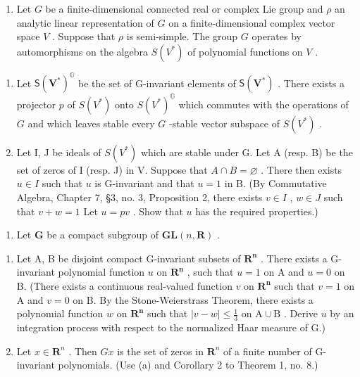\begin{enumerate}
\def\labelenumi{\arabic{enumi}.}
\setcounter{enumi}{33}
\tightlist
\item
  Let \(G\) be a finite-dimensional connected real or complex Lie group and \(\rho\) an analytic linear representation of \(G\) on a finite-dimensional complex vector space \(V\) . Suppose that \(\rho\) is semi-simple. The group \(G\) operates by automorphisms on the algebra \(S(V^*)\) of polynomial functions on \(V\) .
\end{enumerate}

\begin{enumerate}
\def\labelenumi{(\alph{enumi})}
\item
  Let \(\mathsf{S}(\mathbf{V}^{*})^{\mathbb{G}}\) be the set of G-invariant elements of \(\mathsf{S}(\mathbf{V}^{*})\) . There exists a projector \(p\) of \(S(V^{*})\) onto \(S(V^{*})^{\mathbb{G}}\) which commutes with the operations of \(G\) and which leaves stable every \(G\) -stable vector subspace of \(S(V^{*})\) .
\item
  Let I, J be ideals of \(S(V^*)\) which are stable under G. Let A (resp. B) be the set of zeros of I (resp. J) in V. Suppose that \(A \cap B = \varnothing\) . There then exists \(u \in I\) such that \(u\) is G-invariant and that \(u = 1\) in B. (By Commutative Algebra, Chapter 7, §3, no. 3, Proposition 2, there exists \(v \in I\) , \(w \in J\) such that \(v + w = 1\) Let \(u = pv\) . Show that \(u\) has the required properties.)
\end{enumerate}

\begin{enumerate}
\def\labelenumi{\arabic{enumi}.}
\setcounter{enumi}{34}
\tightlist
\item
  Let \(\mathbf{G}\) be a compact subgroup of \(\mathbf{GL}(n,\mathbf{R})\) .
\end{enumerate}

\begin{enumerate}
\def\labelenumi{(\alph{enumi})}
\item
  Let A, B be disjoint compact G-invariant subsets of \(\mathbf{R}^{\mathbf{n}}\) . There exists a G-invariant polynomial function \(u\) on \(\mathbf{R}^{\mathbf{n}}\) , such that \(u = 1\) on \(\mathrm{A}\) and \(u = 0\) on B. (There exists a continuous real-valued function \(v\) on \(\mathbf{R}^{\mathbf{n}}\) such that \(v = 1\) on A and \(v = 0\) on B. By the Stone-Weierstrass Theorem, there exists a polynomial function \(w\) on \(\mathbf{R}^{\mathbf{n}}\) such that \(|v - w| \leqslant \frac{1}{3}\) on \(\mathrm{A} \cup \mathrm{B}\) . Derive \(u\) by an integration process with respect to the normalized Haar measure of G.)
\item
  Let \(x \in \mathbf{R}^n\) . Then \(Gx\) is the set of zeros in \(\mathbf{R}^n\) of a finite number of G-invariant polynomials. (Use (a) and Corollary 2 to Theorem 1, no. 8.)
\end{enumerate}

